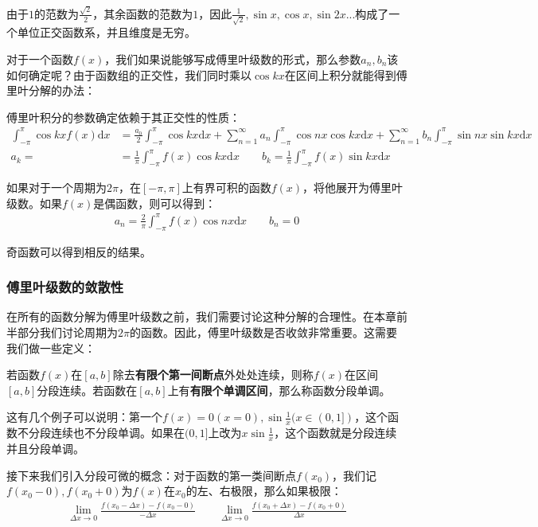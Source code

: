 \documentclass{ctexart}
\let\oldtextbf\textbf
\renewcommand{\textbf}[1]{\textcolor{brown!50!red}{\oldtextbf{#1}}}
\begin{document}
由于$1$的范数为$\frac{\sqrt{2}}{2}$，其余函数的范数为$1$，因此$\frac{1}{\sqrt{2}},\sin x,\cos x,\sin 2x...$构成了一个单位正交函数系，并且维度是无穷。

对于一个函数$f(x)$，我们如果说能够写成傅里叶级数的形式，那么参数$a_n,b_n$该如何确定呢？由于函数组的正交性，我们同时乘以$\cos kx$在区间上积分就能得到傅里叶分解的办法：
\begin{tcolorbox}[
    colback=bac2,     %
    colframe=fra2,   %
    coltitle=white,             %
    coltext=tex2,
    title=傅里叶分解,
    fonttitle=\bfseries,        %
arc=3mm,                     %
breakable
]
傅里叶积分的参数确定依赖于其正交性的性质：
\begin{align*}
\int_{-\pi}^\pi \cos kx f(x)\mathrm{d}x&=\frac{a_0}{2}\int_{-\pi}^\pi \cos kx\mathrm{d}x
+\sum_{n=1}^\infty a_n\int_{-\pi}^\pi \cos nx\cos kx\mathrm{d}x+  \sum_{n=1}^\infty b_n\int_{-\pi}^\pi \sin nx\sin kx\mathrm{d}x\\
a_k=&=\frac{1}{\pi}\int_{-\pi}^\pi f(x)\cos kx\mathrm{d}x\qquad
b_k=\frac{1}{\pi}\int_{-\pi}^\pi f(x)\sin kx\mathrm{d}x  
\end{align*}
\end{tcolorbox}

如果对于一个周期为$2\pi$，在$[-\pi,\pi]$上有界可积的函数$f(x)$，将他展开为傅里叶级数。如果$f(x)$是偶函数，则可以得到：
\begin{align*}
    a_n=\frac{2}{\pi}\int_{-\pi}^\pi f(x)\cos nx\mathrm{d}x\qquad b_n=0
\end{align*}

奇函数可以得到相反的结果。

\subsubsection{傅里叶级数的敛散性}
在所有的函数分解为傅里叶级数之前，我们需要讨论这种分解的合理性。在本章前半部分我们讨论周期为$2\pi$的函数。因此，傅里叶级数是否收敛非常重要。这需要我们做一些定义：

若函数$f(x)$在$[a,b]$除去\textbf{\color{brown!50!red}有限个第一间断点}外处处连续，则称$f(x)$在区间$[a,b]$分段连续。若函数在$[a,b]$上有\textbf{\color{brown!50!red}有限个单调区间}，那么称函数分段单调。

这有几个例子可以说明：第一个$f(x)=0 (x=0),\sin \frac{1}{x} (x\in(0,1])$，这个函数不分段连续也不分段单调。如果在$(0,1]$上改为$x\sin\frac{1}{x}$，这个函数就是分段连续并且分段单调。

接下来我们引入分段可微的概念：对于函数的第一类间断点$f(x_0)$，我们记$f(x_0-0),f(x_0+0)$为$f(x)$在$x_0$的左、右极限，那么如果极限：
\begin{align*}
    \lim_{\Delta x\to 0}\frac{f(x_0-\Delta x)-f(x_0-0)}{-\Delta x}\qquad \lim_{\Delta x\to 0}\frac{f(x_0+\Delta x)-f(x_0+0)}{\Delta x}
\end{align*}
\end{document}
